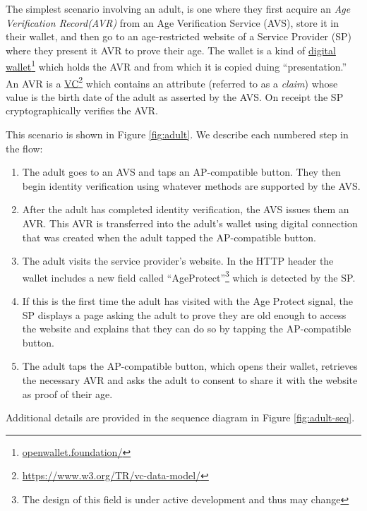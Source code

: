 \documentclass[11pt, oneside]{article}   	%
\newcommand{\hyperfootnote}[1][]{\def\ArgI{{#1}}\hyperfootnoteRelay}
\newcommand\hyperfootnoteRelay[2][]{\href{#1#2}{\ArgI}\footnote{\href{#1#2}{#2}}}
\begin{document}
The simplest scenario involving an adult, is one where they first acquire an \emph{Age Verification Record(AVR)} from an Age Verification Service (AVS), store it in their wallet, and then go to an age-restricted website of a Service Provider (SP) where they present it AVR to prove their age. The wallet is a kind of \hyperfootnote[digital wallet][https://]{openwallet.foundation/} which holds the AVR and from which it is copied duing ``presentation.'' An AVR is a \hyperfootnote[VC][https://]{https://www.w3.org/TR/vc-data-model/} which contains an attribute (referred to as a \emph{claim}) whose value is the birth date of the adult as asserted by the AVS. On receipt the SP cryptographically verifies the AVR. 

This scenario is shown in Figure \ref{fig:adult}. We describe each numbered step in the flow: 

\begin{enumerate}
	\item The adult goes to an AVS and taps an AP-compatible button. They then begin identity verification using whatever methods are supported by the AVS. 
	\item After the adult has completed identity verification, the AVS issues them an AVR. This AVR is transferred into the adult's wallet using digital connection that was created when the adult tapped the AP-compatible button.
	\item The adult visits the service provider's website. In the HTTP header the wallet includes a new field called ``AgeProtect''\footnote{The design of this field is under active development and thus may change} which is detected by the SP. 
	\item If this is the first time the adult has visited with the Age Protect signal, the SP displays a page asking the adult to prove they are old enough to access the website and explains that they can do so by tapping the AP-compatible button.
	\item The adult taps the AP-compatible button, which opens their wallet, retrieves the necessary AVR and asks the adult to consent to share it with the website as proof of their age. 
\end{enumerate}

Additional details are provided in the sequence diagram in Figure \ref{fig:adult-seq}. 
\end{document}
